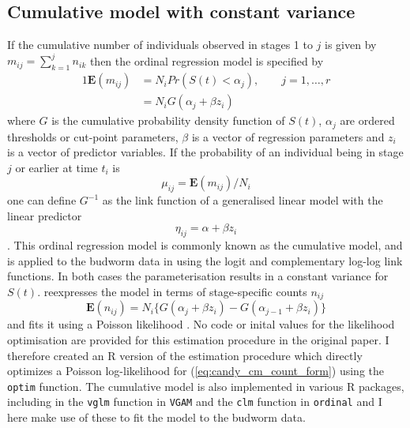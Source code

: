 \subsection{Cumulative model with constant variance }
If the cumulative number of individuals observed in stages 1 to $j$ is given by $m_{ij}=\sum_{k=1}^jn_{ik}$ then the ordinal regression model \citep{mccullagh1980regression} is specified by %
\begin{alignat}{1}
\mathbf{E}(m_{ij})&=N_iPr(S(t) < \alpha_j), \qquad j = 1,\dots ,r\\
&=N_iG(\alpha_j + \beta z_i)
\end{alignat}
where $G$ is the cumulative probability density function of $S(t)$, $\alpha_j$ are ordered thresholds or cut-point parameters, $\beta$ is a vector of regression parameters and $z_i$ is a vector of predictor variables.
If the probability of an individual being in stage $j$ or earlier at time $t_i$ is $$\mu_{ij} = \mathbf{E}(m_{ij})/N_i$$ one can define $G^{-1}$ as the link function of a generalised linear model with the linear predictor $$\eta_{ij}=\alpha+\beta z_i$$. This ordinal regression model is commonly known as the cumulative model, and is applied to the budworm data in \citep{candy1991modeling} using the logit and complementary log-log link functions. 
In both cases the parameterisation results in a constant variance for $S(t)$.
 \citet{candy1991modeling} reexpresses the model in terms of stage-specific counts $n_{ij}$  
\begin{equation}
\mathbf{E}(n_{ij})=N_i\{G(\alpha_j + \beta z_i) - G(\alpha_{j-1} + \beta z_i)\}
\label{eq:candy_cm_count_form}
\end{equation}
and fits it using a Poisson likelihood \citep{thompson1981composite}. 
No code or inital values for the likelihood optimisation are provided for this estimation procedure in the original paper.   
I therefore created an R version of the estimation procedure which directly optimizes a Poisson log-likelihood for (\ref{eq:candy_cm_count_form}) using the \verb+optim+ function.
 The cumulative model is also implemented in various R packages, including in the \verb+vglm+ function in \verb+VGAM+ \citep{VGAM} and the \verb+clm+ function in \verb+ordinal+ \cite{ordinal} and I here make use of these to fit the model to the budworm data.

